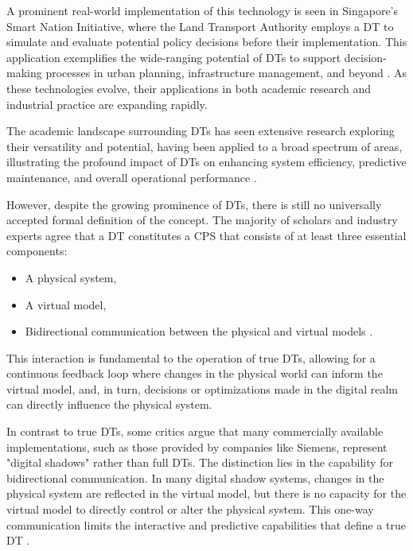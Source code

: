A prominent real-world implementation of this technology is seen in Singapore's Smart Nation Initiative, where the Land Transport Authority employs a \ac{DT} to simulate and evaluate potential policy decisions before their implementation. This application exemplifies the wide-ranging potential of \ac{DTs} to support decision-making processes in urban planning, infrastructure management, and beyond \cite{isprs-archives-XLII-4-W7-37-2017}. As these technologies evolve, their applications in both academic research and industrial practice are expanding rapidly.

The academic landscape surrounding \ac{DTs} has seen extensive research exploring their versatility and potential, having been applied to a broad spectrum of areas, illustrating the profound impact of DTs on enhancing system efficiency, predictive maintenance, and overall operational performance \cite{8361285, TAO2018169, isprs-archives-XLII-4-W7-37-2017, 10.1007/978-3-030-23162-0_19, 6296978}.

However, despite the growing prominence of \ac{DTs}, there is still no universally accepted formal definition of the concept. The majority of scholars and industry experts agree that a \ac{DT} constitutes a \ac{CPS} that consists of at least three essential components:
\begin{itemize}
    \item A physical system,
    \item A virtual model,
    \item Bidirectional communication between the physical and virtual models \cite{TaoFei, 8477101, ROSEN2015567}.
\end{itemize}
This interaction is fundamental to the operation of true \ac{DTs}, allowing for a continuous feedback loop where changes in the physical world can inform the virtual model, and, in turn, decisions or optimizations made in the digital realm can directly influence the physical system.

In contrast to true \ac{DTs}, some critics argue that many commercially available implementations, such as those provided by companies like Siemens, represent "digital shadows" rather than full \ac{DTs}. The distinction lies in the capability for bidirectional communication. In many digital shadow systems, changes in the physical system are reflected in the virtual model, but there is no capacity for the virtual model to directly control or alter the physical system. This one-way communication limits the interactive and predictive capabilities that define a true DT \cite{CIMINO2019103130}.

